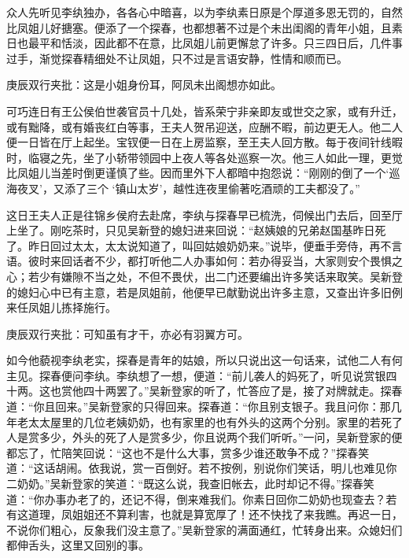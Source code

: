 \begin{parag}
    众人先听见李纨独办，各各心中暗喜，以为李纨素日原是个厚道多恩无罚的，自然比凤姐儿好搪塞。便添了一个探春，也都想著不过是个未出闺阁的青年小姐，且素日也最平和恬淡，因此都不在意，比凤姐儿前更懈怠了许多。只三四日后，几件事过手，渐觉探春精细处不让凤姐，只不过是言语安静，性情和顺而已。\begin{note}庚辰双行夹批：这是小姐身份耳，阿凤未出阁想亦如此。\end{note}可巧连日有王公侯伯世袭官员十几处，皆系荣宁非亲即友或世交之家，或有升迁，或有黜降，或有婚丧红白等事，王夫人贺吊迎送，应酬不暇，前边更无人。他二人便一日皆在厅上起坐。宝钗便一日在上房监察，至王夫人回方散。每于夜间针线暇时，临寝之先，坐了小轿带领园中上夜人等各处巡察一次。他三人如此一理，更觉比凤姐儿当差时倒更谨慎了些。因而里外下人都暗中抱怨说：“刚刚的倒了一个‘巡海夜叉’，又添了三个 ‘镇山太岁’，越性连夜里偷著吃酒顽的工夫都没了。”
\end{parag}


\begin{parag}
    这日王夫人正是往锦乡侯府去赴席，李纨与探春早已梳洗，伺候出门去后，回至厅上坐了。刚吃茶时，只见吴新登的媳妇进来回说：“赵姨娘的兄弟赵国基昨日死了。昨日回过太太，太太说知道了，叫回姑娘奶奶来。”说毕，便垂手旁侍，再不言语。彼时来回话者不少，都打听他二人办事如何：若办得妥当，大家则安个畏惧之心；若少有嫌隙不当之处，不但不畏伏，出二门还要编出许多笑话来取笑。吴新登的媳妇心中已有主意，若是凤姐前，他便早已献勤说出许多主意，又查出许多旧例来任凤姐儿拣择施行。\begin{note}庚辰双行夹批：可知虽有才干，亦必有羽翼方可。\end{note}如今他藐视李纨老实，探春是青年的姑娘，所以只说出这一句话来，试他二人有何主见。探春便问李纨。李纨想了一想，便道：“前儿袭人的妈死了，听见说赏银四十两。这也赏他四十两罢了。”吴新登家的听了，忙答应了是，接了对牌就走。探春道：“你且回来。”吴新登家的只得回来。探春道：“你且别支银子。我且问你：那几年老太太屋里的几位老姨奶奶，也有家里的也有外头的这两个分别。家里的若死了人是赏多少，外头的死了人是赏多少，你且说两个我们听听。”一问，吴新登家的便都忘了，忙陪笑回说：“这也不是什么大事，赏多少谁还敢争不成？”探春笑道：“这话胡闹。依我说，赏一百倒好。若不按例，别说你们笑话，明儿也难见你二奶奶。”吴新登家的笑道：“既这么说，我查旧帐去，此时却记不得。”探春笑道：“你办事办老了的，还记不得，倒来难我们。你素日回你二奶奶也现查去？若有这道理，凤姐姐还不算利害，也就是算宽厚了！还不快找了来我瞧。再迟一日，不说你们粗心，反象我们没主意了。”吴新登家的满面通红，忙转身出来。众媳妇们都伸舌头，这里又回别的事。
\end{parag}


